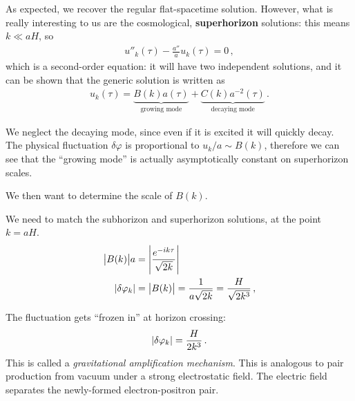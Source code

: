 \documentclass[main.tex]{subfiles}
\begin{document}
As expected, we recover the regular flat-spacetime solution.
However, what is really interesting to us are the cosmological, \textbf{superhorizon} solutions: this means \(k \ll a H\), so 
%
\begin{align}
u''_k (\tau ) - \frac{a''}{a} u_k (\tau ) = 0
\,,
\end{align}
%
which is a second-order equation: it will have two independent solutions, and it can be shown that the generic solution is written as 
%
\begin{align}
u_k(\tau ) = \underbrace{B(k) a(\tau )}_{\text{growing mode}} + \underbrace{C(k) a^{-2}(\tau )}_{\text{decaying mode}}
\,.
\end{align}

We neglect the decaying mode, since even if it is excited it will quickly decay.
The physical fluctuation \(\delta \varphi \) is proportional to \(u_k /a \sim B(k)\), therefore we can see that the ``growing mode'' is actually asymptotically constant on superhorizon scales. 

We then want to determine the scale of \(B(k)\). 

We need to match the subhorizon and superhorizon solutions, at the point \(k = aH\). 
%
\begin{align}
\abs{B(k)} a &= \abs{\frac{e^{-ik \tau }}{\sqrt{2 k}}}   \\
\abs{ \delta \varphi _k} &= \abs{B(k)} = \frac{1}{a \sqrt{2k}} 
= \frac{H}{\sqrt{2 k^3}}
\,,
\end{align}
%

The fluctuation gets ``frozen in'' at horizon crossing: 
%
\begin{align}
\abs{ \delta \varphi _k} = \frac{H}{2 k^3}
\,.
\end{align}
%
This is called a \emph{gravitational amplification mechanism}.
This is analogous to pair production from vacuum under a strong electrostatic field. The electric field separates the newly-formed electron-positron pair. 
\end{document}
